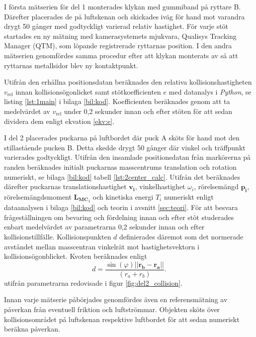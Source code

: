 I första mätserien för del 1 monterades klykan med gummiband på ryttare B. Därefter placerades de på luftskenan och skickades iväg för hand mot varandra drygt 50 gånger med godtyckligt varierad relativ hastighet. För varje stöt startades en ny mätning med kamerasystemets mjukvara, Qualisys Tracking Manager (QTM), som löpande registrerade ryttarnas position. I den andra mätserien genomfördes samma procedur efter att klykan monterats av så att ryttarnas metallsidor blev ny kontaktpunkt.  %

Utifrån den erhållna positionsdatan beräknades den relativa kollisionshastigheten $v_{\text{rel}}$ innan kollisionsögonlicket samt stötkoefficienten $e$ med datanalys i \textit{Python}, se listing \ref{lst:1main} i bilaga \ref{bil:kod}. Koefficienten beräknades genom att ta medelvärdet av $v_{\text{rel}}$ under 0,2 sekunder innan och efter stöten för att sedan dividera dem enligt ekvation \eqref{ekv:e}. %

I del 2 placerades puckarna på luftbordet där puck A sköts för hand mot den stillastående pucken B. Detta skedde drygt 50 gånger där vinkel och träffpunkt varierades godtyckligt. Utifrån den insamlade positionsdatan från markörerna på randen beräknades initialt puckarnas masscentrums translation och rotation numeriskt, se bilaga \ref{bil:kod} tabell \ref{lst:2center_calc}. Utifrån det beräknades därefter puckarnas translationshastighet $\mathbf{v_i}$, vinkelhastighet $\omega_i$, rörelsemängd $\mathbf{p_i}$, rörelsemängdsmoment $\mathbf{L_{MC}}_i$ och kinetiska energi $T_i$ numeriskt enligt dataanalysen i bilaga \ref{bil:kod} och teorin i avsnitt \ref{sec:teori}. För att besvara frågeställningen om bevaring och fördelning innan och efter stöt studerades enbart medelvärdet av parametrarna 0,2 sekunder innan och efter kollisionstillfälle. Kollisionspunkten $d$ definierades däremot som det normerade avståndet mellan masscentran vinkelrät mot hastighetsvektorn i kollisionsögonblicket. Kvoten beräknades enligt 
\begin{equation} \label{ekv:d_calc}
    d=\frac{\sin(\varphi)||\mathbf{r_b}-\mathbf{r_a}||}{(r_a+r_b)}.
\end{equation} %
utifrån parametrarna redovisade i figur \ref{fig:del2_collision}.

Innan varje mätserie påbörjades genomfördes även en referensmätning av påverkan från eventuell friktion och luftströmmar. Objekten sköts över kollisionsområdet på luftskenan respektive luftbordet för att sedan numeriskt beräkna påverkan. 